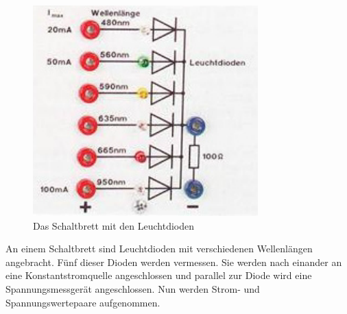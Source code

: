 \begin{figure}[h!]
\centering
\includegraphics[scale=1]{Grafiken/Schaltplatte.pdf}
\caption{Das Schaltbrett mit den Leuchtdioden \cite{Metzler07}}
\end{figure}
An einem Schaltbrett sind Leuchtdioden mit verschiedenen Wellenlängen angebracht. Fünf dieser Dioden werden vermessen. Sie werden nach einander an eine Konstantstromquelle angeschlossen und parallel zur Diode wird eine Spannungsmessgerät angeschlossen. Nun werden Strom- und Spannungswertepaare aufgenommen.

